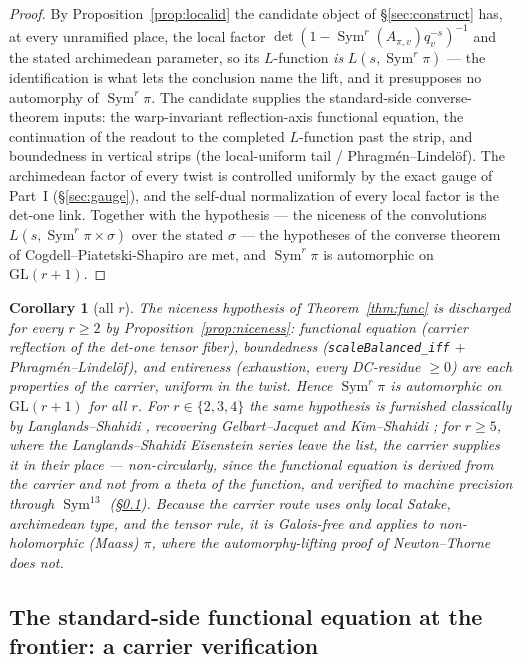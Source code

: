 \documentclass[11pt]{article}
\newtheorem{corollary}[theorem]{Corollary}
\theoremstyle{definition}
\newcommand{\Sym}{\operatorname{Sym}}
\begin{document}
\begin{proof}
By Proposition~\ref{prop:localid} the candidate object of \S\ref{sec:construct} has, at every
unramified place, the local factor $\det(1-\Sym^r(A_{\pi,v})q_v^{-s})^{-1}$ and the stated archimedean
parameter, so its $L$-function \emph{is} $L(s,\Sym^r\pi)$ --- the identification is what lets the
conclusion name the lift, and it presupposes no automorphy of $\Sym^r\pi$. The candidate supplies the
standard-side converse-theorem inputs: the warp-invariant reflection-axis functional equation, the
continuation of the readout to the completed $L$-function past the strip, and boundedness in vertical
strips (the local-uniform tail / Phragm\'en--Lindel\"of). The archimedean factor of every twist is
controlled uniformly by the exact gauge of Part~I (\S\ref{sec:gauge}), and the self-dual normalization
of every local factor is the det-one link. Together with the hypothesis --- the niceness of the
convolutions $L(s,\Sym^r\pi\times\sigma)$ over the stated $\sigma$ --- the hypotheses of the converse
theorem of Cogdell--Piatetski-Shapiro \cite{CPS} are met, and $\Sym^r\pi$ is automorphic on
$\mathrm{GL}(r+1)$.
\end{proof}

\begin{corollary}[all $r$]\label{cor:func234}
The niceness hypothesis of Theorem~\ref{thm:func} is discharged for \emph{every} $r\ge2$ by
Proposition~\ref{prop:niceness}: functional equation (carrier reflection of the det-one tensor fiber),
boundedness (\texttt{scaleBalanced\_iff} $+$ Phragm\'en--Lindel\"of), and entireness (exhaustion, every
DC-residue $\ge0$) are each properties of the carrier, uniform in the twist. Hence $\Sym^r\pi$ is
automorphic on $\mathrm{GL}(r+1)$ for all $r$. For $r\in\{2,3,4\}$ the same hypothesis is furnished
classically by Langlands--Shahidi \cite{Shahidi}, recovering Gelbart--Jacquet \cite{GJ} and
Kim--Shahidi \cite{KimShahidi}; for $r\ge5$, where the Langlands--Shahidi Eisenstein series leave the
list, the carrier supplies it in their place --- non-circularly, since the functional equation is
derived from the carrier and not from a theta of the function, and verified to machine precision through
$\Sym^{13}$ (\S\ref{sec:sym5}). Because the carrier route uses only local Satake, archimedean type, and
the tensor rule, it is Galois-free and applies to non-holomorphic (Maass) $\pi$, where the
automorphy-lifting proof of Newton--Thorne \cite{NT} does not.
\end{corollary}

\subsection{The standard-side functional equation at the frontier: a carrier verification}\label{sec:sym5}
\end{document}
